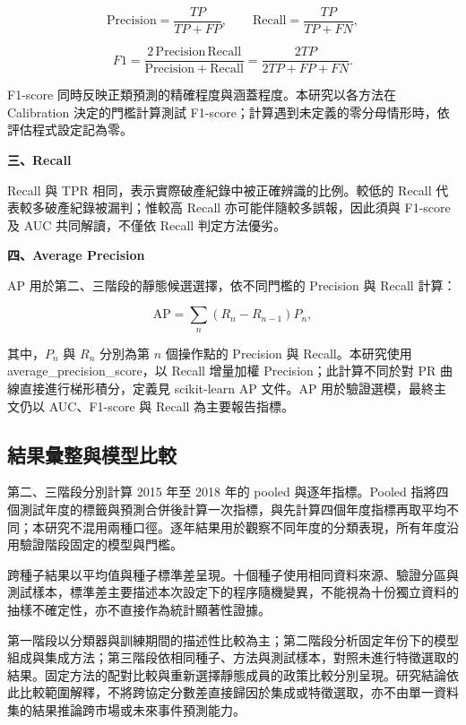 \begin{equation}\label{eq:recall}
\mathrm{Precision}=\frac{TP}{TP+FP},\qquad
\mathrm{Recall}=\frac{TP}{TP+FN},
\end{equation}

\begin{equation}\label{eq:method-f1}
F1=\frac{2\,\mathrm{Precision}\,\mathrm{Recall}}
{\mathrm{Precision}+\mathrm{Recall}}
=\frac{2TP}{2TP+FP+FN}.
\end{equation}

F1-score 同時反映正類預測的精確程度與涵蓋程度。本研究以各方法在 Calibration 決定的門檻計算測試 F1-score；計算遇到未定義的零分母情形時，依評估程式設定記為零。

\textbf{三、Recall}

Recall 與 TPR 相同，表示實際破產紀錄中被正確辨識的比例。較低的 Recall 代表較多破產紀錄被漏判；惟較高 Recall 亦可能伴隨較多誤報，因此須與 F1-score 及 AUC 共同解讀，不僅依 Recall 判定方法優劣。

\textbf{四、Average Precision}

AP 用於第二、三階段的靜態候選選擇，依不同門檻的 Precision 與 Recall 計算：

\begin{equation}\label{eq:method-ap}
\mathrm{AP}=\sum_n(R_n-R_{n-1})P_n,
\end{equation}

其中，\(P_n\) 與 \(R_n\) 分別為第 \(n\) 個操作點的 Precision 與 Recall。本研究使用 {\normalfont average\_\allowbreak{}precision\_\allowbreak{}score}，以 Recall 增量加權 Precision；此計算不同於對 PR 曲線直接進行梯形積分，定義見 scikit-learn AP 文件\autocite{sklearn-ap-docs}。AP 用於驗證選模，最終主文仍以 AUC、F1-score 與 Recall 為主要報告指標。

\subsection{結果彙整與模型比較}

第二、三階段分別計算 2015 年至 2018 年的 pooled 與逐年指標。Pooled 指將四個測試年度的標籤與預測合併後計算一次指標，與先計算四個年度指標再取平均不同；本研究不混用兩種口徑。逐年結果用於觀察不同年度的分類表現，所有年度沿用驗證階段固定的模型與門檻。

跨種子結果以平均值與種子標準差呈現。十個種子使用相同資料來源、驗證分區與測試樣本，標準差主要描述本次設定下的程序隨機變異，不能視為十份獨立資料的抽樣不確定性，亦不直接作為統計顯著性證據。

第一階段以分類器與訓練期間的描述性比較為主；第二階段分析固定年份下的模型組成與集成方法；第三階段依相同種子、方法與測試樣本，對照未進行特徵選取的結果。固定方法的配對比較與重新選擇靜態成員的政策比較分別呈現。研究結論依此比較範圍解釋，不將跨協定分數差直接歸因於集成或特徵選取，亦不由單一資料集的結果推論跨市場或未來事件預測能力。
\endgroup

